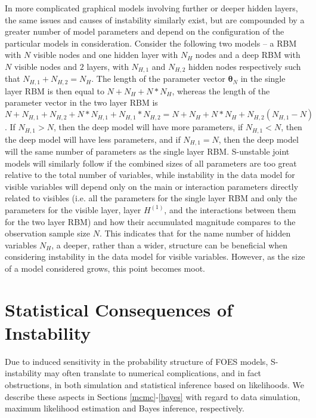 \documentclass[numbib]{imamat}
\theoremstyle{theorem}
\theoremstyle{lemma}
\theoremstyle{example}
\theoremstyle{corollary}
\theoremstyle{definition}
\theoremstyle{remark}
\theoremstyle{approximation}
\theoremstyle{scheme}
\newcommand{\ak}[1]{{\color{blue} #1}}
\begin{document}
In more complicated graphical models involving further or deeper hidden layers, the same issues and causes of instability similarly exist, but are compounded by a greater number of model parameters \ak{and depend on the configuration of the particular models in consideration. Consider the following two models -- a RBM with $N$ visible nodes and one hidden layer with $N_H$ nodes and a deep RBM with $N$ visible nodes and $2$ layers, with $N_{H,1}$ and $N_{H,2}$ hidden nodes respectively such that $N_{H,1} + N_{H,2} = N_H$. The length of the parameter vector $\boldsymbol \theta_N$ in the single layer RBM is then equal to $N + N_H + N*N_H$, whereas the length of the parameter vector in the two layer RBM is $N + N_{H,1} + N_{H,2} + N*N_{H,1} + N_{H,1}*N_{H,2} = N + N_H + N*N_H + N_{H,2}(N_{H,1} - N)$. If $N_{H,1} > N$, then the deep model will have more parameters, if $N_{H,1} < N$, then the deep model will have less parameters, and if $N_{H,1} = N$, then the deep model will the same number of parameters as the single layer RBM.} S-unstable joint models will similarly follow if the combined sizes of all parameters are too great relative to the total number of variables, while instability in the data model for visible variables will depend only on the main or interaction parameters directly related to visibles \ak{(i.e. all the parameters for the single layer RBM and only the parameters for the visible layer, layer $H^{(1)}$, and the interactions between them for the two layer RBM)} and how their accumulated magnitude compares to the observation sample size \(N\). \ak{This indicates that for the name number of hidden variables $N_H$, a deeper, rather than a wider, structure can be beneficial when considering instability in the data model for visible variables. However, as the size of a model considered grows, this point becomes moot.}

\hypertarget{implications}{%
\section{Statistical Consequences of Instability}\label{implications}}

Due to \ak{induced sensitivity in the probability structure of FOES models, S-instability} may often translate to numerical complications, and in fact obstructions, in both simulation and statistical inference based on likelihoods. We describe these aspects in Sections \ref{mcmc}-\ref{bayes} with regard to data simulation, maximum likelihood estimation and Bayes inference, respectively.
\end{document}
